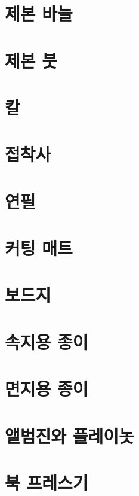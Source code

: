 \documentclass[12pt, a4paper, oneside]{book}
\begin{document}
	\section{제본 바늘}

	\section{제본 붓}

	\section{칼}

	\section{접착사}

	\section{연필}

	\section{커팅 매트}


	\section{보드지}

	\section{속지용 종이}

	\section{면지용 종이}

	\section{앨범진와 플레이놋}

	\section{북 프레스기}
\end{document}
